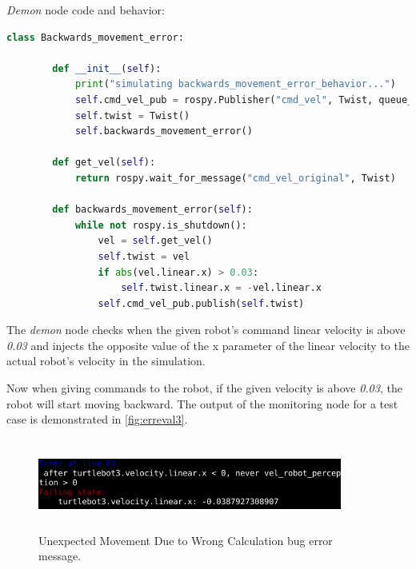 \textit{Demon} node code and behavior:

\begin{lstlisting}[language=python]
    class Backwards_movement_error:

        def __init__(self):
            print("simulating backwards_movement_error_behavior...")
            self.cmd_vel_pub = rospy.Publisher("cmd_vel", Twist, queue_size=1)
            self.twist = Twist()
            self.backwards_movement_error()

        def get_vel(self):
            return rospy.wait_for_message("cmd_vel_original", Twist)

        def backwards_movement_error(self):
            while not rospy.is_shutdown():
                vel = self.get_vel()
                self.twist = vel
                if abs(vel.linear.x) > 0.03:
                    self.twist.linear.x = -vel.linear.x
                self.cmd_vel_pub.publish(self.twist)
\end{lstlisting}

The \textit{demon} node checks when the given robot's command linear velocity is above \textit{0.03} and injects the opposite value of the x parameter of the linear velocity to the actual robot's velocity in the simulation.

Now when giving commands to the robot, if the given velocity is above \textit{0.03}, the robot will start moving backward. The output of the monitoring node for a test case is demonstrated in \autoref{fig:erreval3}.

\begin{figure}
\begin{center}
\includegraphics[width=10cm,height=3cm,keepaspectratio,]{images/erreval3.png}
\caption{Unexpected Movement Due to Wrong Calculation bug error message.} \label{fig:erreval3}
\end{center}
\end{figure}
